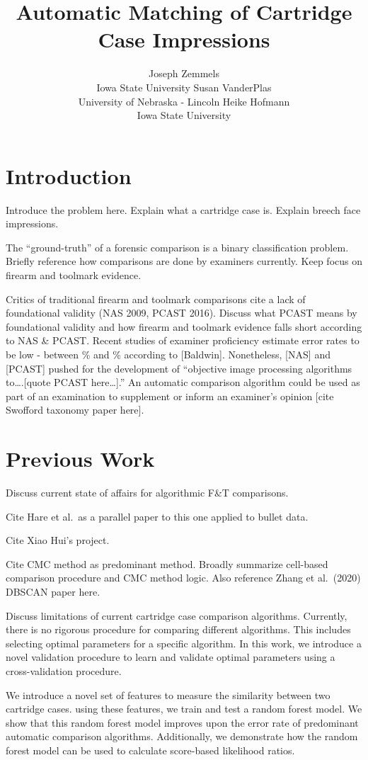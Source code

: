 \documentclass[
]{jdssv}
\author{
Joseph Zemmels\\Iowa State University \And Susan VanderPlas\\University
of Nebraska - Lincoln \And Heike Hofmann\\Iowa State University
}
\title{Automatic Matching of Cartridge Case Impressions}
\begin{document}
\hypertarget{introduction}{%
\section{Introduction}\label{introduction}}

Introduce the problem here. Explain what a cartridge case is. Explain
breech face impressions.

The ``ground-truth'' of a forensic comparison is a binary classification
problem. Briefly reference how comparisons are done by examiners
currently. Keep focus on firearm and toolmark evidence.

Critics of traditional firearm and toolmark comparisons cite a lack of
foundational validity (NAS 2009, PCAST 2016). Discuss what PCAST means
by foundational validity and how firearm and toolmark evidence falls
short according to NAS \& PCAST. Recent studies of examiner proficiency
estimate error rates to be low - between \% and \% according to
{[}Baldwin{]}. Nonetheless, {[}NAS{]} and {[}PCAST{]} pushed for the
development of ``objective image processing algorithms to\ldots.{[}quote
PCAST here\ldots{]}.'' An automatic comparison algorithm could be used
as part of an examination to supplement or inform an examiner's opinion
{[}cite Swofford taxonomy paper here{]}.

\hypertarget{previous-work}{%
\section{Previous Work}\label{previous-work}}

Discuss current state of affairs for algorithmic F\&T comparisons.

Cite Hare et al.~as a parallel paper to this one applied to bullet data.

Cite Xiao Hui's project.

Cite CMC method as predominant method. Broadly summarize cell-based
comparison procedure and CMC method logic. Also reference Zhang et
al.~(2020) DBSCAN paper here.

Discuss limitations of current cartridge case comparison algorithms.
Currently, there is no rigorous procedure for comparing different
algorithms. This includes selecting optimal parameters for a specific
algorithm. In this work, we introduce a novel validation procedure to
learn and validate optimal parameters using a cross-validation
procedure.

We introduce a novel set of features to measure the similarity between
two cartridge cases. using these features, we train and test a random
forest model. We show that this random forest model improves upon the
error rate of predominant automatic comparison algorithms. Additionally,
we demonstrate how the random forest model can be used to calculate
score-based likelihood ratios.
\end{document}
